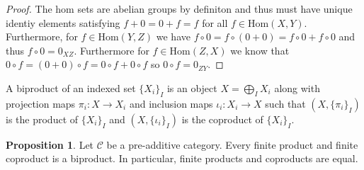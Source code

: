 \documentclass[12pt]{article}
\newcommand{\Hom}[2]{\mathrm{Hom}\left(#1, #2 \right)}
\theoremstyle{remark}
\theoremstyle{definition}
\newtheorem{proposition}[theorem]{Proposition}
\newenvironment{definition}[1][Definition:]{\begin{trivlist}
\item[\hskip \labelsep {\bfseries #1}]}{\end{trivlist}}
\begin{document}
\begin{proof}
The hom sets are abelian groups by definiton and thus must have unique identiy elements satisfying $f + 0 = 0 + f = f$ for all $f \in \Hom{X}{Y}$. Furthermore, for $f \in \Hom{Y}{Z}$ we have $f \circ 0 = f \circ (0 + 0) = f \circ 0 + f \circ 0$ and thus $f \circ 0 = 0_{XZ}$. Furthermore for $f \in \Hom{Z}{X}$ we know that $0 \circ f = (0 + 0) \circ f = 0 \circ f + 0 \circ f$ so $0 \circ f = 0_{ZY}$.  
\end{proof}

\begin{definition}
A biproduct of an indexed set $\{X_i\}_I$ is an object $X = \bigoplus_I X_i$ along with projection maps $\pi_i : X \to X_i$ and inclusion maps $\iota_i : X_i \to X$ such that $(X, \{ \pi_i \}_I)$ is the product of $\{X_i\}_I$ and $(X, \{ \iota_i \}_I )$ is the coproduct of $\{ X_i \}_I$.  
\end{definition}



\begin{proposition}
Let $\mathcal{C}$ be a pre-additive category. Every finite product and finite coproduct is a biproduct. In particular, finite products and coproducts are equal. 
\end{proposition}
\end{document}
